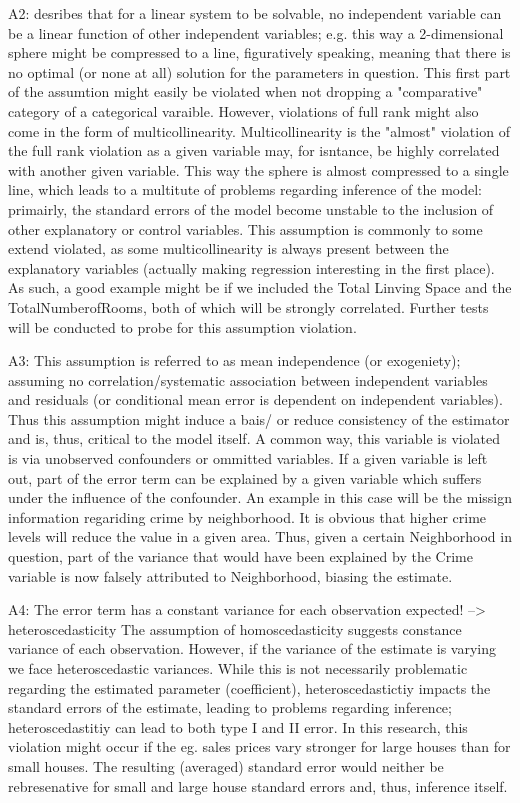 \documentclass{article}
\begin{document}
A2: desribes that for a linear system to be solvable, no independent variable can be a linear function of other independent variables; e.g. this way a 2-dimensional sphere might be compressed to a line, figuratively speaking, meaning that there is no optimal (or none at all) solution for the parameters in question. This first part of the assumtion might easily be violated when not dropping a "comparative" category of a categorical varaible. However, violations of full rank might also come in the form of multicollinearity. Multicollinearity is the "almost" violation of the full rank violation as a given variable may, for isntance, be highly correlated with another given variable. This way the sphere is almost compressed to a single line, which leads to a multitute of problems regarding inference of the model: primairly, the standard errors of the model become unstable to the inclusion of other explanatory or control variables. This assumption is commonly to some extend violated, as some multicollinearity is always present between the explanatory variables (actually making regression interesting in the first place). As such, a good example might be if we included the Total Linving Space and the TotalNumberofRooms, both of which will be strongly correlated. Further tests will be conducted to probe for this assumption violation. 

A3: This assumption is referred to as mean independence (or exogeniety); assuming no correlation/systematic association between independent variables and residuals (or conditional mean error is dependent on independent variables). Thus this assumption might induce a bais/ or reduce consistency of the estimator and is, thus, critical to the model itself. A common way, this variable is violated is via unobserved confounders or ommitted variables. If a given variable is left out, part of the error term can be explained by a given variable which suffers under the influence of the confounder. An example in this case will be the missign information regariding crime by neighborhood. It is obvious that higher crime levels will reduce the value in a given area. Thus, given a certain Neighborhood in question, part of the variance that would have been explained by the Crime variable is now falsely attributed to Neighborhood, biasing the estimate.

A4: The error term has a constant variance for each observation expected! --> heteroscedasticity
The assumption of homoscedasticity suggests constance variance of each observation. However, if the variance of the estimate is varying we face heteroscedastic variances. While this is not necessarily problematic regarding the estimated parameter (coefficient), heteroscedastictiy impacts the standard errors of the estimate, leading to problems regarding inference; heteroscedastitiy can lead to both type I and II error. In this research, this violation might occur if the eg. sales prices vary stronger for large houses than for small houses. The resulting (averaged) standard error would neither be rebresenative for small and large house standard errors and, thus, inference itself.
\end{document}
